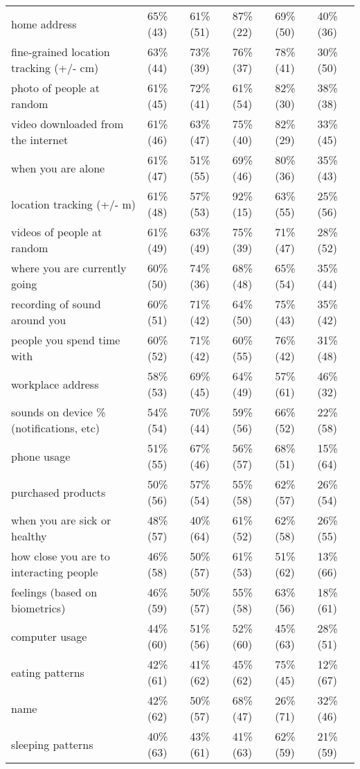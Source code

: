 \documentclass[a4paper,12pt]{article}
\begin{document}
\begin{longtable}{| p{7cm} | l | l | l | l | l |}
home address & 65\% (43) & 61\% (51) & 87\% (22) & 69\% (50) & 40\% (36) \\ 
fine-grained location tracking (+/-  cm) & 63\% (44) & 73\% (39) & 76\% (37) & 78\% (41) & 30\% (50) \\ 
photo of people at random & 61\% (45) & 72\% (41) & 61\% (54) & 82\% (30) & 38\% (38) \\ 
video downloaded from the internet & 61\% (46) & 63\% (47) & 75\% (40) & 82\% (29) & 33\% (45) \\ 
when you are alone & 61\% (47) & 51\% (55) & 69\% (46) & 80\% (36) & 35\% (43) \\ 
location tracking (+/- m) & 61\% (48) & 57\% (53) & 92\% (15) & 63\% (55) & 25\% (56) \\ 
videos of people at random & 61\% (49) & 63\% (49) & 75\% (39) & 71\% (47) & 28\% (52) \\ 
where you are currently going & 60\% (50) & 74\% (36) & 68\% (48) & 65\% (54) & 35\% (44) \\ 
recording of sound around you & 60\% (51) & 71\% (42) & 64\% (50) & 75\% (43) & 35\% (42) \\ 
people you spend time with & 60\% (52) & 71\% (42) & 60\% (55) & 76\% (42) & 31\% (48) \\ 
workplace address & 58\% (53) & 69\% (45) & 64\% (49) & 57\% (61) & 46\% (32) \\ 
sounds on device \% (notifications, etc) & 54\% (54) & 70\% (44) & 59\% (56) & 66\% (52) & 22\% (58) \\ 
phone usage & 51\% (55) & 67\% (46) & 56\% (57) & 68\% (51) & 15\% (64) \\ 
purchased products & 50\% (56) & 57\% (54) & 55\% (58) & 62\% (57) & 26\% (54) \\ 
when you are sick or healthy & 48\% (57) & 40\% (64) & 61\% (52) & 62\% (58) & 26\% (55) \\ 
how close you are to interacting people & 46\% (58) & 50\% (57) & 61\% (53) & 51\% (62) & 13\% (66) \\ 
feelings (based on biometrics) & 46\% (59) & 50\% (57) & 55\% (58) & 63\% (56) & 18\% (61) \\ 
computer usage& 44\% (60) & 51\% (56) & 52\% (60) & 45\% (63) & 28\% (51) \\ 
eating patterns & 42\% (61) & 41\% (62) & 45\% (62) & 75\% (45) & 12\% (67) \\ 
name & 42\% (62) & 50\% (57) & 68\% (47) & 26\% (71) & 32\% (46) \\ 
sleeping patterns & 40\% (63) & 43\% (61) & 41\% (63) & 62\% (59) & 21\% (59) \\ 

\end{longtable}
\end{document}
